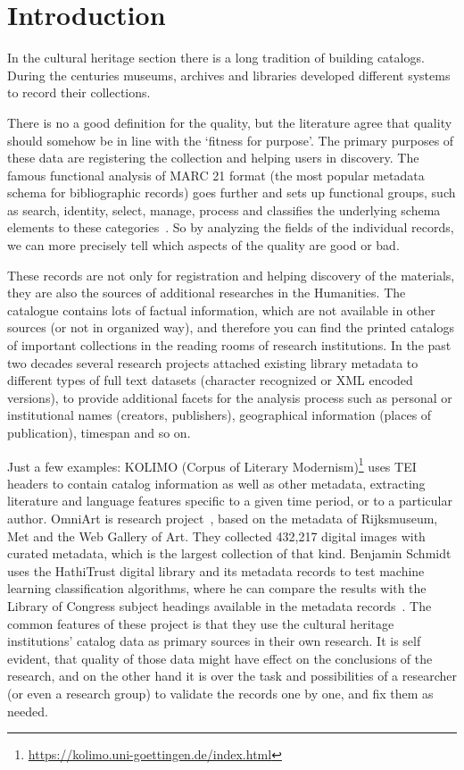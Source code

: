 \chapter{Introduction}

In the cultural heritage section there is a long tradition of building catalogs. During the centuries museums, archives and libraries developed different systems to record their collections.

There is no a good definition for the quality, but the literature agree that quality should somehow be in line with the `fitness for purpose'. The primary purposes of these data are registering the collection and helping users in discovery. The famous functional analysis of MARC 21 format (the most popular metadata  schema for bibliographic records) goes further and sets up functional groups, such as search, identity, select, manage, process and classifies the underlying schema elements to these categories~\cite{frbr1998, loc2006}. So by analyzing the fields of the individual records, we can more precisely tell which aspects of the quality are good or bad.

These records are not only for registration and helping discovery of the materials, they are also the sources of additional researches in the Humanities. The catalogue contains lots of factual information, which are not available in other sources (or not in organized way), and therefore you can find the printed catalogs of important collections in the reading rooms of research institutions. In the past two decades several research projects attached existing library metadata to different types of full text datasets (character recognized or XML encoded versions), to provide additional facets for the analysis process such as personal or institutional names (creators, publishers), geographical information (places of publication), timespan and so on.

Just a few examples: KOLIMO (Corpus of Literary Modernism)\footnote{\url{https://kolimo.uni-goettingen.de/index.html}} uses TEI headers to contain catalog information as well as other metadata, extracting literature and language features specific to a given time period, or to a particular author. OmniArt is research project~\cite{strezoski2017}, based on the metadata of Rijksmuseum, Met and the Web Gallery of Art. They collected 432,217 digital images with curated metadata, which is the largest collection of that kind. Benjamin Schmidt uses the HathiTrust digital library and its metadata records to test machine learning classification algorithms, where he can compare the results with the Library of Congress subject headings available in the metadata records~\cite{smith2017}. The common features of these project is that they use the cultural heritage institutions’ catalog data as primary sources in their own research. It is self evident, that quality of those data might have effect on the conclusions of the research, and on the other hand it is over the task and possibilities of a researcher (or even a research group) to validate the records one by one, and fix them as needed.

